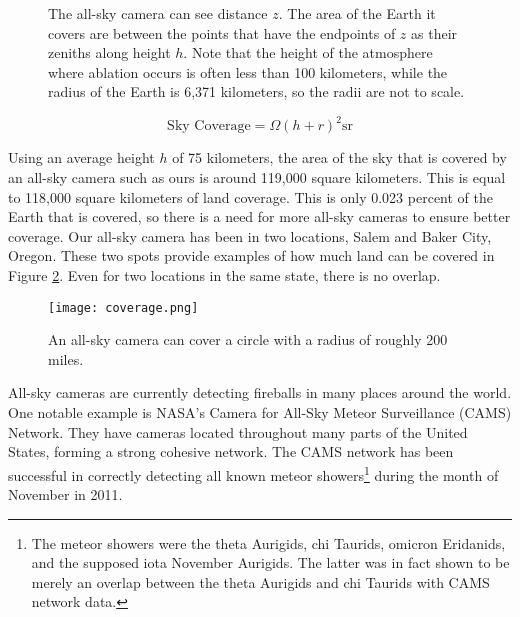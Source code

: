 \begin{figure}[ht!]
	\centering
	\caption{The all-sky camera can see distance $z$. The area of the Earth it covers are between the points that have the endpoints of $z$ as their zeniths along height $h$. Note that the height of the atmosphere where ablation occurs is often less than 100 kilometers, while the radius of the Earth is 6,371 kilometers, so the radii are not to scale.}
	\label{fig:atmosphere}
\end{figure}


\begin{equation} \label{eq:coverage}
	\textrm{Sky Coverage} = \Omega(h+r)^2 \textrm{sr}
\end{equation}

Using an average height $h$ of 75 kilometers, the area of the sky that is covered by an all-sky camera such as ours is around 119,000 square kilometers. This is equal to 118,000 square kilometers of land coverage. This is only 0.023 percent of the Earth that is covered, so there is a need for more all-sky cameras to ensure better coverage. Our all-sky camera has been in two locations, Salem and Baker City, Oregon. These two spots provide examples of how much land can be covered in Figure \ref{fig:coverage}. Even for two locations in the same state, there is no overlap.

\begin{figure}[ht!]
	\centering
	\texttt{[image: coverage.png]}
	\caption{An all-sky camera can cover a circle with a radius of roughly 200 miles.}
	\label{fig:coverage}
\end{figure}


All-sky cameras are currently detecting fireballs in many places around the world. One notable example is NASA's Camera for All-Sky Meteor Surveillance (CAMS) Network. They have cameras located throughout many parts of the United States, forming a strong cohesive network. The CAMS network has been successful in correctly detecting all known meteor showers\footnote{The meteor showers were the theta Aurigids, chi Taurids, omicron Eridanids, and the supposed iota November Aurigids. The latter was in fact shown to be merely an overlap between the theta Aurigids and chi Taurids with CAMS network data.} during the month of November in 2011\cite{Jenniskens2011}.

